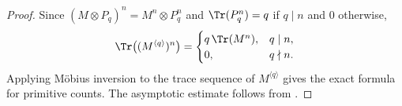 \begin{proof}
  Since $(M\otimes P_q)^n=M^n\otimes P_q^n$ and
  $\Tr(P_q^n)=q$ if $q\mid n$ and $0$ otherwise,
  \[
    \Tr\bigl((M^{\langle q\rangle})^n\bigr)
    =
    \begin{cases}
      q\,\Tr(M^n), & q\mid n,\\
      0, & q\nmid n.
    \end{cases}
  \]
  Applying Möbius inversion to the trace sequence of
  $M^{\langle q\rangle}$ gives the exact formula for primitive counts.
  The asymptotic estimate follows from
  .
\end{proof}
